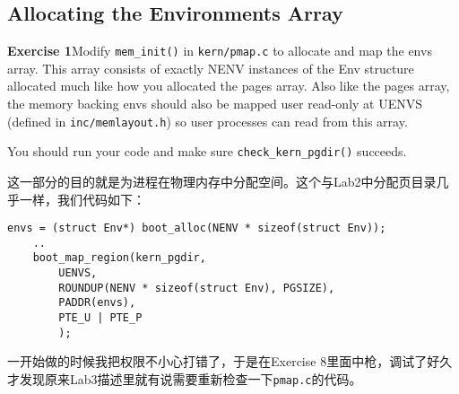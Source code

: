 \documentclass[11pt]{article}
\begin{document}
\subsection{Allocating the Environments Array}
\begin{framed}
\noindent\textbf{Exercise 1}Modify \lstinline|mem_init()| in \lstinline|kern/pmap.c| to allocate and map the envs array. This array consists of exactly NENV instances of the Env structure allocated much like how you allocated the pages array. Also like the pages array, the memory backing envs should also be mapped user read-only at UENVS (defined in \lstinline|inc/memlayout.h|) so user processes can read from this array.

You should run your code and make sure \lstinline|check_kern_pgdir()| succeeds. 
\end{framed}
这一部分的目的就是为进程在物理内存中分配空间。这个与Lab2中分配页目录几乎一样，我们代码如下：
\begin{lstlisting}[title=kern/pmap.c]
	envs = (struct Env*) boot_alloc(NENV * sizeof(struct Env));
	..
	boot_map_region(kern_pgdir,
		UENVS,
		ROUNDUP(NENV * sizeof(struct Env), PGSIZE),
		PADDR(envs),
		PTE_U | PTE_P
		);
\end{lstlisting}
一开始做的时候我把权限不小心打错了，于是在Exercise 8里面中枪，调试了好久才发现原来Lab3描述里就有说需要重新检查一下\lstinline|pmap.c|的代码。
\end{document}
